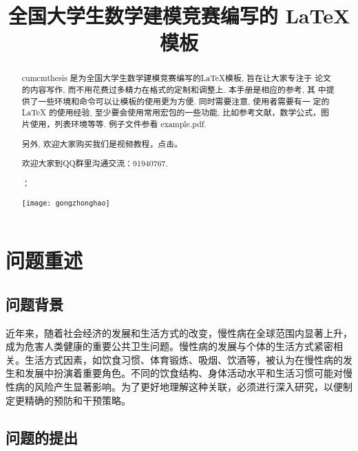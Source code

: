 \documentclass{cumcmthesis}
\title{全国大学生数学建模竞赛编写的 \LaTeX{} 模板}
\begin{document}
 \maketitle
 \begin{abstract}
cumcmthesis 是为全国大学生数学建模竞赛编写的\LaTeX{}模板, 旨在让大家专注于 论文的内容写作, 而不用花费过多精力在格式的定制和调整上. 本手册是相应的参考, 其 中提供了一些环境和命令可以让模板的使用更为方便. 同时需要注意, 使用者需要有一 定的 \LaTeX{} 的使用经验, 至少要会使用常用宏包的一些功能, 比如参考文献，数学公式，图片使用，列表环境等等. 例子文件参看 example.pdf.

另外, 欢迎大家购买我们是视频教程，点击\href{https://item.taobao.com/item.htm?spm=a1z10.1-c.w4004-3473795048.4.ThFQCG&id=43823508044}{}。

欢迎大家到QQ群里沟通交流：91940767.

：

\centerline{\texttt{[image: gongzhonghao]}}

\end{abstract}

\tableofcontents

















\clearpage
\section{问题重述}
\subsection{问题背景}
近年来，随着社会经济的发展和生活方式的改变，慢性病在全球范围内显著上升，成为危害人类健康的重要公共卫生问题。慢性病的发展与个体的生活方式紧密相关。生活方式因素，如饮食习惯、体育锻炼、吸烟、饮酒等，被认为在慢性病的发生和发展中扮演着重要角色。不同的饮食结构、身体活动水平和生活习惯可能对慢性病的风险产生显著影响。为了更好地理解这种关联，必须进行深入研究，以便制定更精确的预防和干预策略。

\subsection{问题的提出}
\end{document}
